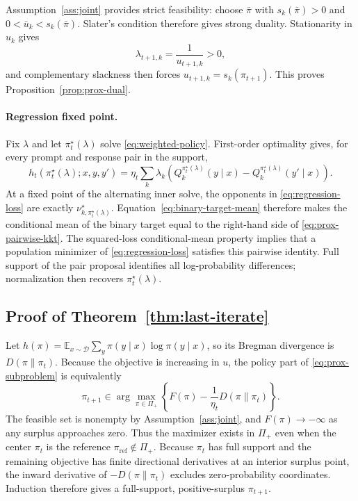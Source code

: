 \documentclass{article}
\theoremstyle{remark}
\theoremstyle{plain}
\newcommand{\E}{\mathbb{E}}
\newcommand{\D}{\mathcal{D}}
\newcommand{\piref}{\pi_{\mathrm{ref}}}
\begin{document}
Assumption~\ref{ass:joint} provides strict feasibility: choose $\bar\pi$ with $s_k(\bar\pi)>0$ and $0<\bar u_k<s_k(\bar\pi)$. Slater's condition therefore gives strong duality. Stationarity in $u_k$ gives
\[
\lambda_{t+1,k}=\frac{1}{u_{t+1,k}}>0,
\]
and complementary slackness then forces $u_{t+1,k}=s_k(\pi_{t+1})$. This proves Proposition~\ref{prop:prox-dual}.

\paragraph{Regression fixed point.}
Fix $\lambda$ and let $\pi_t^\star(\lambda)$ solve \eqref{eq:weighted-policy}. First-order optimality gives, for every prompt and response pair in the support,
\begin{equation}
h_t(\pi_t^\star(\lambda);x,y,y')
=
\eta_t\sum_k\lambda_k
\left(
Q_k^{\pi_t^\star(\lambda)}(y\mid x)
-
Q_k^{\pi_t^\star(\lambda)}(y'\mid x)
\right).
\label{eq:prox-pairwise-kkt}
\end{equation}
At a fixed point of the alternating inner solve, the opponents in \eqref{eq:regression-loss} are exactly $\nu^\star_{k,\pi_t^\star(\lambda)}$. Equation~\eqref{eq:binary-target-mean} therefore makes the conditional mean of the binary target equal to the right-hand side of \eqref{eq:prox-pairwise-kkt}. The squared-loss conditional-mean property implies that a population minimizer of \eqref{eq:regression-loss} satisfies this pairwise identity. Full support of the pair proposal identifies all log-probability differences; normalization then recovers $\pi_t^\star(\lambda)$.

\subsection{Proof of Theorem~\ref{thm:last-iterate}}
\label{app:convergence}
Let $h(\pi)=\E_{x\sim\D}\sum_y\pi(y\mid x)\log\pi(y\mid x)$, so its Bregman divergence is $D(\pi\|\pi_t)$. Because the objective is increasing in $u$, the policy part of \eqref{eq:prox-subproblem} is equivalently
\begin{equation}
\pi_{t+1}
\in
\arg\max_{\pi\in\Pi_+}
\left\{F(\pi)-\frac1{\eta_t}D(\pi\|\pi_t)\right\}.
\label{eq:implicit-prox}
\end{equation}
The feasible set is nonempty by Assumption~\ref{ass:joint}, and $F(\pi)\to-\infty$ as any surplus approaches zero. Thus the maximizer exists in $\Pi_+$ even when the center $\pi_t$ is the reference $\piref\notin\Pi_+$. Because $\pi_t$ has full support and the remaining objective has finite directional derivatives at an interior surplus point, the inward derivative of $-D(\pi\|\pi_t)$ excludes zero-probability coordinates. Induction therefore gives a full-support, positive-surplus $\pi_{t+1}$.
\end{document}
